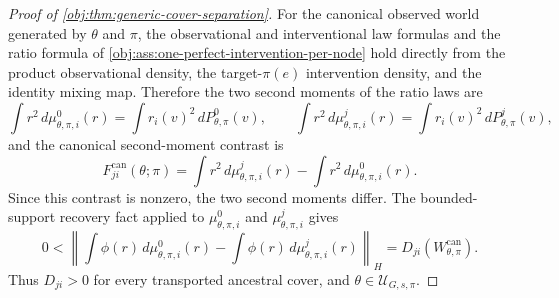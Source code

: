 \documentclass[11pt]{article}
\begin{document}
\begin{proof}[Proof of \cref{obj:thm:generic-cover-separation}]
For the canonical observed world generated by \(\theta\) and \(\pi\), the
observational and interventional law formulas and the ratio formula of
\cref{obj:ass:one-perfect-intervention-per-node} hold directly from the product
observational density, the target-\(\pi(e)\) intervention density, and the
identity mixing map.  Therefore the two second moments of the ratio laws are
\[
\int r^2\,d\mu^0_{\theta,\pi,i}(r)
=
\int r_i(v)^2\,dP^0_{\theta,\pi}(v),
\qquad
\int r^2\,d\mu^j_{\theta,\pi,i}(r)
=
\int r_i(v)^2\,dP^j_{\theta,\pi}(v),
\]
and the canonical second-moment contrast is
\[
F^{\mathrm{can}}_{ji}(\theta;\pi)
=
\int r^2\,d\mu^j_{\theta,\pi,i}(r)
-
\int r^2\,d\mu^0_{\theta,\pi,i}(r).
\]
Since this contrast is nonzero, the two second moments differ.  The
bounded-support recovery fact applied to
\(\mu^0_{\theta,\pi,i}\) and \(\mu^j_{\theta,\pi,i}\) gives
\[
0<
\left\|
\int \phi(r)\,d\mu^0_{\theta,\pi,i}(r)
-
\int \phi(r)\,d\mu^j_{\theta,\pi,i}(r)
\right\|_H
=
D_{ji}\!\left(W_{\theta,\pi}^{\mathrm{can}}\right).
\]
Thus \(D_{ji}>0\) for every transported ancestral cover, and
\(\theta\in\mathcal U_{G,s,\pi}\). %


\end{proof}
\end{document}
